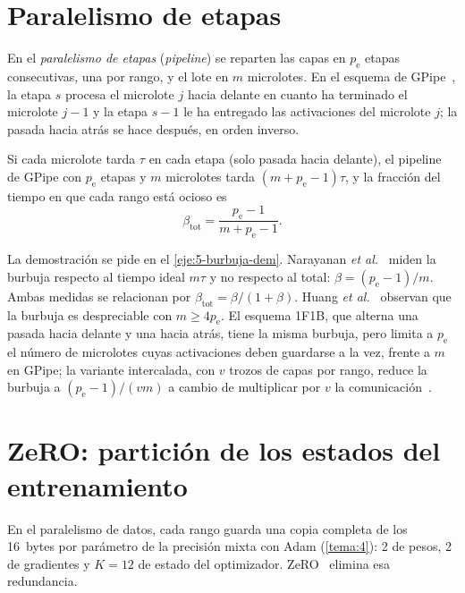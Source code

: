\section{Paralelismo de etapas}

\begin{definicion}
En el \emph{paralelismo de etapas} (\emph{pipeline}) se reparten las capas en $p_{\mathrm{e}}$ etapas consecutivas, una por rango, y el lote en $m$ microlotes. En el esquema de GPipe~\cite{gpipe}, la etapa $s$ procesa el microlote $j$ hacia delante en cuanto ha terminado el microlote $j-1$ y la etapa $s-1$ le ha entregado las activaciones del microlote $j$; la pasada hacia atrás se hace después, en orden inverso.
\end{definicion}

\addtocounter{figure}{1}%

\begin{proposicion}\label{prop:burbuja}
Si cada microlote tarda $\tau$ en cada etapa (solo pasada hacia delante), el pipeline de GPipe con $p_{\mathrm{e}}$ etapas y $m$ microlotes tarda $(m+p_{\mathrm{e}}-1)\tau$, y la fracción del tiempo en que cada rango está ocioso es
\[
\beta_{\mathrm{tot}}=\frac{p_{\mathrm{e}}-1}{m+p_{\mathrm{e}}-1}.
\]
\end{proposicion}

La demostración se pide en el \cref{eje:5-burbuja-dem}. Narayanan \emph{et al.}~\cite[§2.2.1]{narayanan} miden la burbuja respecto al tiempo ideal $m\tau$ y no respecto al total: $\beta=(p_{\mathrm{e}}-1)/m$. Ambas medidas se relacionan por $\beta_{\mathrm{tot}}=\beta/(1+\beta)$. Huang \emph{et al.}~\cite[§2.3]{gpipe} observan que la burbuja es despreciable con $m\ge 4p_{\mathrm{e}}$. El esquema 1F1B, que alterna una pasada hacia delante y una hacia atrás, tiene la misma burbuja, pero limita a $p_{\mathrm{e}}$ el número de microlotes cuyas activaciones deben guardarse a la vez, frente a $m$ en GPipe; la variante intercalada, con $v$ trozos de capas por rango, reduce la burbuja a $(p_{\mathrm{e}}-1)/(vm)$ a cambio de multiplicar por $v$ la comunicación~\cite[§2.2.2]{narayanan}.

\section{ZeRO: partición de los estados del entrenamiento}

En el paralelismo de datos, cada rango guarda una copia completa de los 16~bytes por parámetro de la precisión mixta con Adam (\cref{tema:4}): 2 de pesos, 2 de gradientes y $K=12$ de estado del optimizador. ZeRO~\cite{zero} elimina esa redundancia.

